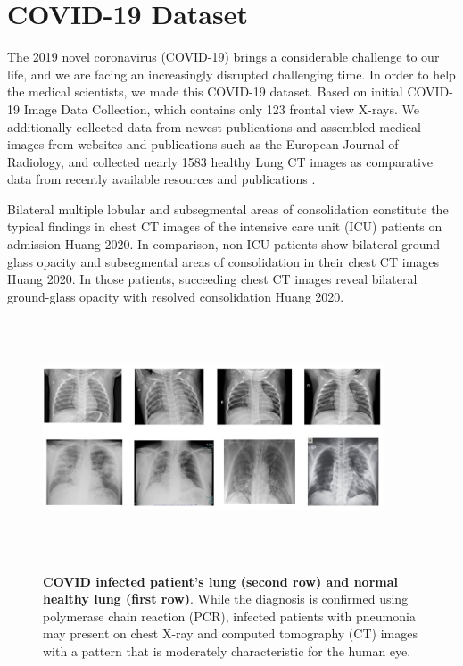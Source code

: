 \section{COVID-19 Dataset} %
\label{sub:amet}

The 2019 novel coronavirus (COVID-19) brings a considerable challenge to our life, and we are facing an increasingly disrupted challenging time. In order to help the medical scientists, we made this COVID-19 dataset. Based on initial COVID-19 Image Data Collection\cite{37}, which contains only 123 frontal view X-rays. We additionally collected data from newest publications and assembled medical images from websites and publications such as the European Journal of Radiology\cite{36}, and collected nearly 1583 healthy Lung CT images as comparative data from recently available resources and publications\cite{37} \cite{38}.


Bilateral multiple lobular and subsegmental areas of consolidation constitute the typical findings in chest CT images of the intensive care unit (ICU) patients on admission Huang 2020. In comparison, non-ICU patients show bilateral ground-glass opacity and subsegmental areas of consolidation in their chest CT images Huang 2020. In those patients, succeeding chest CT images reveal bilateral ground-glass opacity with resolved consolidation Huang 2020.

\begin{figure}[t]
\begin{center}
\includegraphics[height=200pt,width=0.9\textwidth]{thesis-template-master/images/covidlungandhealthylung.JPG}
\label{fig:cellnet}
\end{center}
\caption{\textbf{COVID infected patient’s lung (second row) and normal healthy lung (first row)}. While the diagnosis is confirmed using polymerase chain reaction (PCR), infected patients with pneumonia may present on chest X-ray and computed tomography (CT) images with a pattern that is moderately characteristic for the human eye.}
\end{figure}



